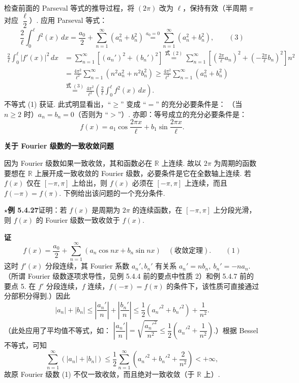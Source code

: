 \documentclass[UTF8,12pt,a4paper,fontset=fandol]{ctexart}
\providecommand{\xlongequal}[1]{\stackrel{#1}{=}}
\begin{document}
检查前面的 Parseval 等式的推导过程，将 $(2\pi)$ 改为 $\ell$，保持有效（半周期 $\pi$ 对应 $\dfrac{\ell}{2}$）. 应用 Parseval 等式：
\[
  \frac2{\ell}\int_0^{\ell}f^2(x)\,dx
  =\frac{a_0}{2}+\sum_{n=1}^{\infty}(a_n^2+b_n^2)
  \xlongequal{a_0=0}\sum_{n=1}^{\infty}(a_n^2+b_n^2), \qquad(3)
\]
\[
\begin{aligned}
\frac2{\ell}\int_0^{\ell}|f'(x)|^2\,dx
&=\sum_{n=1}^{\infty}[(a_n')^2+(b_n')^2]
\xlongequal{\text{式 }(2)}
\sum_{n=1}^{\infty}\left[\left(\frac{2\pi}{\ell}a_n\right)^2+
\left(-\frac{2\pi}{\ell}b_n\right)^2\right]n^2\\
&=\frac{4\pi^2}{\ell^2}\sum_{n=1}^{\infty}(n^2a_n^2+n^2b_n^2)
\ge\frac{4\pi^2}{\ell^2}\sum_{n=1}^{\infty}(a_n^2+b_n^2)\\
&\xlongequal{\text{式 }(3)}
\frac{4\pi^2}{\ell^2}\left(\frac2{\ell}\int_0^{\ell}f^2(x)\,dx\right).
\end{aligned}
\]
不等式 (1) 获证. 此式明显看出，``$\ge$'' 变成 ``$=$'' 的充分必要条件是：
（当 $n\ge2$ 时）$a_n=b_n=0$（否则为 ``$>$''）. 亦即：等号成立的充分必要条件是：
\[
  f(x)=a_1\cos\frac{2\pi x}{\ell}+b_1\sin\frac{2\pi x}{\ell}.
\]

\noindent\textbf{关于 Fourier 级数的一致收敛问题}

因为 Fourier 级数如果一致收敛，其和函数必在 $\mathbb R$ 上连续. 故以 $2\pi$ 为周期的函数要想在 $\mathbb R$ 上展开成一致收敛的 Fourier 级数，必要条件是它在全数轴上连续. 若
$f(x)$ 仅在 $[-\pi,\pi]$ 上给出，则 $f(x)$ 必须在 $[-\pi,\pi]$ 上连续，而且
$f(-\pi)=f(\pi)$. 下例给出该问题的一个充分条件.

\noindent\(\star\)\textbf{例 5.4.27}\quad 证明：若 $f(x)$ 是周期为 $2\pi$ 的连续函数，在 $[-\pi,\pi]$ 上分段光滑，则 $f(x)$ 的 Fourier 级数一致收敛于 $f(x)$.

\noindent\textbf{证}\quad
\[
  f(x)=\frac{a_0}{2}+\sum_{n=1}^{\infty}(a_n\cos nx+b_n\sin nx) \quad(\text{收敛定理}). \qquad(1)
\]
这时 $f'(x)$ 分段连续，其 Fourier 系数 $a_n',b_n'$ 有关系
$a_n'=nb_n,\ b_n'=-na_n$.
（所谓 Fourier 级数逐项求导性，见例 5.4.4 前的要点中性质 2）和例 5.4.7 前的要点 5. 在 $f'$ 分段连续，$f$ 连续，$f(-\pi)=f(\pi)$ 的条件下，该性质可直接通过分部积分得到.）因此
\[
  |a_n|+|b_n|\le\left|\frac{a_n'}{n}\right|+\left|\frac{b_n'}{n}\right|
  \le\frac12(a_n'^2+b_n'^2)+\frac1{n^2}.
\]
（此处应用了平均值不等式，如：
$\left|\dfrac{a_n'}{n}\right|=\sqrt{\dfrac{a_n'^2}{n^2}}\le
\dfrac12\left(a_n'^2+\dfrac1{n^2}\right)$.）根据 Bessel 不等式，可知
\[
  \sum_{n=1}^{\infty}(|a_n|+|b_n|)
  \le\frac12\sum_{n=1}^{\infty}\left(a_n'^2+b_n'^2+\frac2{n^2}\right)<+\infty,
\]
故原 Fourier 级数 (1) 不仅一致收敛，而且绝对一致收敛（于 $\mathbb R$ 上）.
\end{document}
